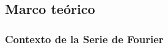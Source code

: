 %
%
%
%

\chapter{\TituloCapUno}
\label{cap:01}

\section{Marco teórico}
\label{sec:cap01:marco-teorico}

\subsection{Contexto de la Serie de Fourier}
\label{sec:cap01:marco-teorico:contexto}

